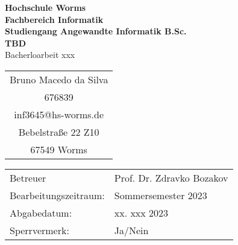 \begin{titlepage}
    \vspace*{2mm}
    \begin{center}
        \Large
        \textbf{Hochschule Worms}\\
        \textbf{Fachbereich Informatik}\\
        \textbf{Studiengang Angewandte Informatik B.Sc.}\\
        \vspace{3cm}
        \textbf{TBD}\\
        \vspace{1cm}
        \large
        Bacherloarbeit xxx\\
        \vspace{3cm}
        \begin {table}[ht]
        \centering
            \begin{tabular}{c}
                Bruno Macedo da Silva  \\ 
                676839                \\
                inf3645@hs-worms.de   \\
                Bebelstraße 22 Z10    \\
                67549 Worms            \\
            \end{tabular}
        \end {table}
        \vspace{2cm}
        \large
        \vspace{1cm}
        \begin{table}[h]
            \centering
            \begin{tabular}{l l}
                Betreuer                  & Prof. Dr. Zdravko Bozakov \\
                Bearbeitungszeitraum:     & Sommersemester 2023 \\
                Abgabedatum:              & xx. xxx 2023 \\
                Sperrvermerk:             & Ja/Nein \\
            \end{tabular}
        \end{table}    
    \end{center}
    \normalsize
    \vfill
\end{titlepage}